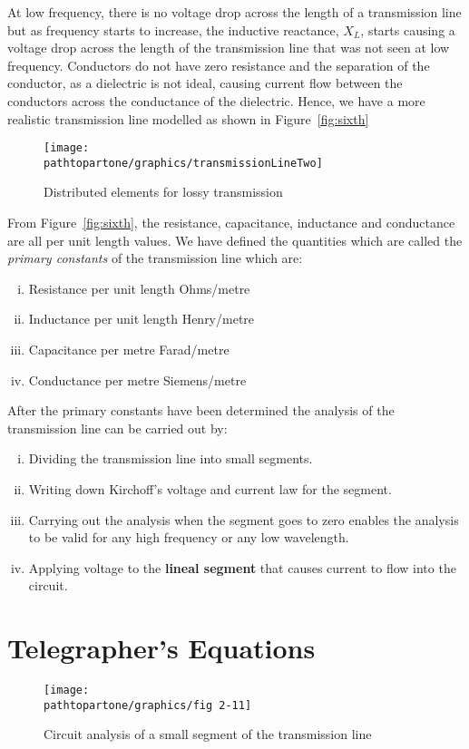 At low frequency, there is no voltage drop across the length of a transmission line but as frequency starts to increase, the inductive reactance, $X_{L}$, starts causing a voltage drop across the length of the transmission line that was not seen at low frequency. Conductors do not have zero resistance and the separation of the conductor, as a dielectric is not ideal, causing current flow between the conductors across the conductance of the dielectric. Hence, we have a more realistic transmission line modelled as shown in Figure~\ref{fig:sixth}
\begin{figure}[h]
\centering
\texttt{[image: \\pathtopartone/graphics/transmissionLineTwo]}
\caption{Distributed elements for lossy transmission}
\label{fig:transmissionLineLossy}
\end{figure}


From Figure~\ref{fig:sixth}, the resistance, capacitance, inductance and conductance are all per unit length values. We have defined the quantities which are called the \textit{primary constants} of the transmission line which are:
\begin{enumerate}[(i)]
\item Resistance per unit length \textemdash\; Ohms/metre
\item Inductance per unit length \textemdash\; Henry/metre
\item Capacitance per metre \textemdash\; Farad/metre
\item Conductance per metre \textemdash\; Siemens/metre
\end{enumerate}
After the primary constants have been determined the analysis of the transmission line can be carried out by:

\begin{enumerate}[(i)]
\item Dividing the transmission line into small segments.
\item Writing down Kirchoff's voltage and current law for the segment.
\item Carrying out the analysis when the segment goes to zero enables the analysis to be valid for any high frequency or any low wavelength. 
\item Applying voltage to the \textbf{lineal segment} that causes current to flow into the circuit.
\end{enumerate}

\section{Telegrapher's Equations}
\begin{figure}[h]
\centering
\texttt{[image: \\pathtopartone/graphics/fig 2-11]}
\caption{Circuit analysis of a small segment of the transmission line}
\label{fig:seventh}
\end{figure}

